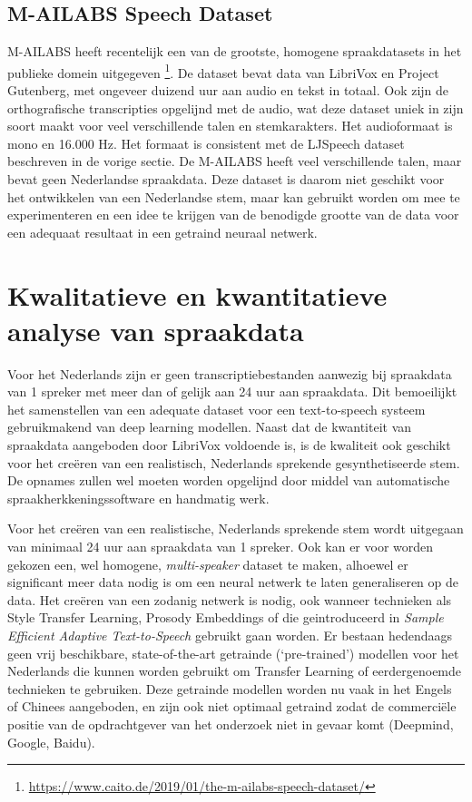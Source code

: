 \subsection{M-AILABS Speech Dataset}
M-AILABS heeft recentelijk een van de grootste, homogene spraakdatasets in het publieke domein uitgegeven
\footnote{\url{https://www.caito.de/2019/01/the-m-ailabs-speech-dataset/}}. De dataset bevat data van LibriVox en Project Gutenberg, met ongeveer duizend uur aan audio en tekst in totaal. Ook zijn de orthografische transcripties opgelijnd met de audio, wat deze dataset uniek in zijn soort maakt voor veel verschillende talen en stemkarakters. Het audioformaat is mono en 16.000 Hz. Het formaat is consistent met de LJSpeech dataset beschreven in de vorige sectie. De M-AILABS heeft veel verschillende talen, maar bevat geen Nederlandse spraakdata. Deze dataset is daarom niet geschikt voor het ontwikkelen van een Nederlandse stem, maar kan gebruikt worden om mee te experimenteren en een idee te krijgen van de benodigde grootte van de data voor een adequaat resultaat in een getraind neuraal netwerk.

\section{Kwalitatieve en kwantitatieve analyse van spraakdata}

Voor het Nederlands zijn er geen transcriptiebestanden aanwezig bij spraakdata van 1 spreker met meer dan of gelijk aan 24 uur aan spraakdata. Dit bemoeilijkt het samenstellen van een adequate dataset voor een text-to-speech systeem gebruikmakend van deep learning modellen. Naast dat de kwantiteit van spraakdata aangeboden door LibriVox voldoende is, is de kwaliteit ook geschikt voor het creëren van een realistisch, Nederlands sprekende gesynthetiseerde stem. De opnames zullen wel moeten worden opgelijnd door middel van automatische spraakherkkeningssoftware en handmatig werk.

Voor het creëren van een realistische, Nederlands sprekende stem wordt uitgegaan van minimaal 24 uur aan spraakdata van 1 spreker. Ook kan er voor worden gekozen een, wel homogene, \textit{multi-speaker} dataset te maken, alhoewel er significant meer data nodig is om een neural netwerk te laten generaliseren op de data. Het creëren van een zodanig netwerk is nodig, ook wanneer technieken als Style Transfer Learning, Prosody Embeddings of die geintroduceerd in \textit{Sample Efficient Adaptive Text-to-Speech} gebruikt gaan worden. Er bestaan hedendaags geen vrij beschikbare, state-of-the-art getrainde (`pre-trained') modellen voor het Nederlands die kunnen worden gebruikt om Transfer Learning of eerdergenoemde technieken te gebruiken. Deze getrainde modellen worden nu vaak in het Engels of Chinees aangeboden, en zijn ook niet optimaal getraind zodat de commerciële positie van de opdrachtgever van het onderzoek niet in gevaar komt (Deepmind, Google, Baidu).

